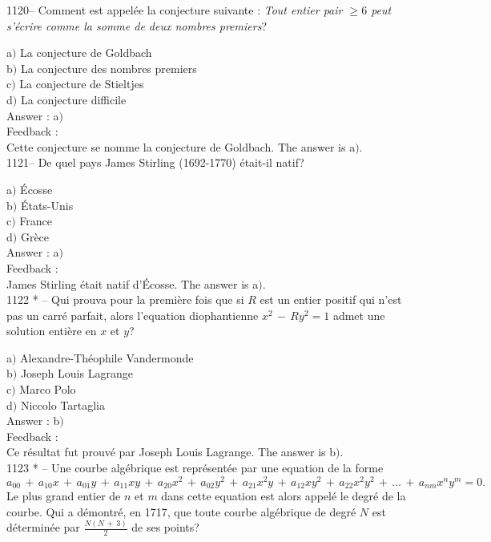\documentclass[letterpaper, 12pt]{article}
\begin{document}
1120-- Comment est appel\'ee la conjecture suivante : {\sl Tout
entier pair $\ge6$ peut s'\'ecrire comme la somme de deux nombres
premiers}?

a$)$ La conjecture de Goldbach \\
b$)$ La conjecture des nombres premiers  \\
c$)$ La conjecture de Stieltjes \\
d$)$ La conjecture difficile \\

Answer : a$)$\\

Feedback : \\
Cette conjecture se nomme la conjecture de Goldbach.
The answer is a$)$.\\

1121-- De quel pays James Stirling (1692-1770) \'etait-il natif?

a$)$ \'Ecosse \\
b$)$ \'Etats-Unis \\
c$)$ France  \\
d$)$ Gr\`ece   \\

Answer : a$)$\\

Feedback : \\
James Stirling \'etait natif d'\'Ecosse.
The answer is a$)$.\\


1122 * -- Qui prouva pour la premi\`ere fois que si $R$ est un
entier positif qui n'est pas un carr\'e parfait, alors l'equation
diophantienne $x^2\,-\,Ry^2=1$ admet une solution enti\`ere en $x$
et $y$?

a$)$ Alexandre-Th\'eophile Vandermonde \\
b$)$ Joseph Louis Lagrange \\
c$)$ Marco Polo \\
d$)$ Niccolo Tartaglia \\

Answer : b$)$\\

Feedback : \\
Ce r\'esultat fut prouv\'e par Joseph Louis Lagrange.
The answer is b$)$.\\


1123 * -- Une courbe alg\'ebrique est repr\'esent\'ee par une
equation de la forme
$$a_{00}\,+\,a_{10}x\,+\,a_{01}y\,+\,a_{11}xy\,+\,a_{20}x^2\,+\,a_{02}y^2\,+\,a_{21}x^2y\,+\,a_{12}xy^2\,+\,a_{22}x^2y^2\,+\,\ldots\,+\,a_{nm}x^ny^m=0.$$
Le plus grand entier de $n$ et $m$ dans cette equation est alors
appel\'e le degr\'e de la courbe. Qui a d\'emontr\'e, en 1717, que
toute courbe alg\'ebrique de degr\'e $N$ est d\'etermin\'ee par
$\frac{N(N\,+\,3)}2$ de ses points?
\end{document}
